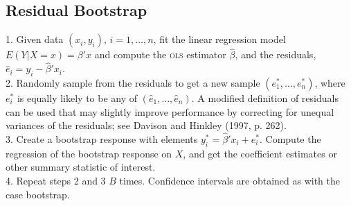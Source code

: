 \documentclass[14pt]{extarticle}
\begin{document}
\subsection*{Residual Bootstrap}
1. Given data \((x_i, y_i), \, i = 1, \ldots, n\), fit the linear regression model \( E(Y|X = x) = \beta' x \) and compute the \textsc{ols} estimator \(\hat{\beta}\), and the residuals, \(\hat{e}_i = y_i - \hat{\beta}' x_i\).\\
2. Randomly sample from the residuals to get a new sample \((e_1^*, \ldots, e_n^*)\), where \(e_i^*\) is equally likely to be any of \((\hat{e}_1, \ldots, \hat{e}_n)\). A modified definition of residuals can be used that may slightly improve performance by correcting for unequal variances of the residuals; see Davison and Hinkley (1997, p. 262).\\
3. Create a bootstrap response with elements \(y_i^* = \hat{\beta}' x_i + e_i^*\). Compute the regression of the bootstrap response on \(X\), and get the coefficient estimates or other summary statistic of interest.\\
4. Repeat steps 2 and 3 \(B\) times. Confidence intervals are obtained as with the case bootstrap.
\end{document}
